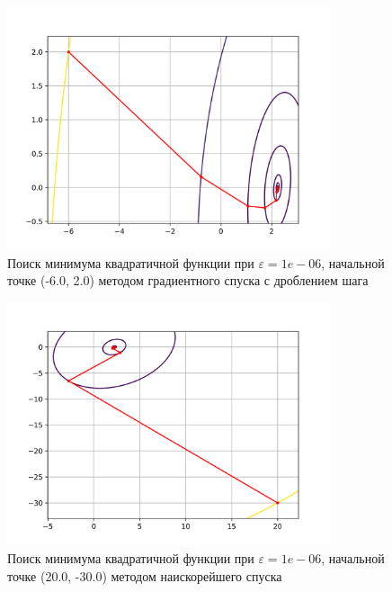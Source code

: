             \begin{figure}[H]
	        \centering
	        \includegraphics[width=0.85\textwidth]{Метод градиентного спуска с дробным шагом, eps 1e-06, start = (-6.000000, 2.000000), Квадратичная функция}%
	        \caption{Поиск минимума квадратичной функции при $\varepsilon = 1e-06$, начальной точке (-6.0, 2.0) методом градиентного спуска с дроблением шага}
	        \vspace*{-1.2cm}
            \end{figure}
            
            \begin{figure}[H]
	        \centering
	        \includegraphics[width=0.85\textwidth]{Метод наискорейшего спуска, eps 1e-06, start = (20.000000, -30.000000), Квадратичная функция}%
	        \caption{Поиск минимума квадратичной функции при $\varepsilon = 1e-06$, начальной точке (20.0, -30.0) методом наискорейшего спуска}
	        \vspace*{-1.2cm}
            \end{figure}
            
